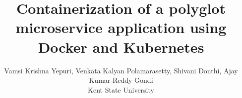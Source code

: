 \usepackage{filecontents}
\usepackage{cite}
\usepackage{amsmath,amssymb,amsfonts}
\usepackage{graphicx}
\usepackage{textcomp}
\usepackage{tabularx}
\usepackage{subcaption}
\usepackage{makecell}
\usepackage{url}
\usepackage[switch]{lineno}
\usepackage{listings}
\usepackage{multirow}
\usepackage{graphicx}
\usepackage{adjustbox}

\captionsetup{compatibility=false}
\usepackage[margin=0.5in]{geometry}
\usepackage{textcomp}

\usepackage{listings}
\usepackage{tikz}
\def\checkmark{\tikz\fill[scale=0.4](0,.35) -- (.25,0) -- (1,.7) -- (.25,.15) -- cycle;} 
\graphicspath{ {./images/} }




\title{ Containerization of a polyglot microservice application using
Docker and Kubernetes 
}

\author{Vamsi Krishna Yepuri,  Venkata Kalyan Polamarasetty, Shivani Donthi, Ajay Kumar Reddy Gondi \\
Kent State University}


